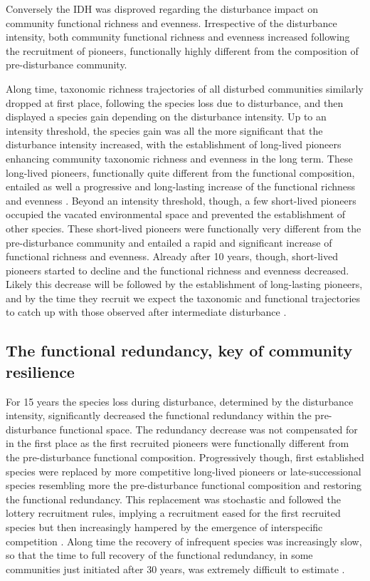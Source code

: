 \documentclass[fleqn,10pt]{ArtEcoFoG} %
\begin{document}
Conversely the IDH was disproved regarding the disturbance impact on
community functional richness and evenness. Irrespective of the
disturbance intensity, both community functional richness and evenness
increased following the recruitment of pioneers, functionally highly
different from the composition of pre-disturbance community.

Along time, taxonomic richness trajectories of all disturbed communities
similarly dropped at first place, following the species loss due to
disturbance, and then displayed a species gain depending on the
disturbance intensity. Up to an intensity threshold, the species gain
was all the more significant that the disturbance intensity increased,
with the establishment of long-lived pioneers enhancing community
taxonomic richness and evenness in the long term. These long-lived
pioneers, functionally quite different from the functional composition,
entailed as well a progressive and long-lasting increase of the
functional richness and evenness \citep{Denslow1980, Molino2001}. Beyond
an intensity threshold, though, a few short-lived pioneers occupied the
vacated environmental space and prevented the establishment of other
species. These short-lived pioneers were functionally very different
from the pre-disturbance community and entailed a rapid and significant
increase of functional richness and evenness. Already after 10 years,
though, short-lived pioneers started to decline and the functional
richness and evenness decreased. Likely this decrease will be followed
by the establishment of long-lasting pioneers, and by the time they
recruit we expect the taxonomic and functional trajectories to catch up
with those observed after intermediate disturbance \citep{Walker2009}.

\subsection{The functional redundancy, key of community
resilience}\label{the-functional-redundancy-key-of-community-resilience}

For 15 years the species loss during disturbance, determined by the
disturbance intensity, significantly decreased the functional redundancy
within the pre-disturbance functional space. The redundancy decrease was
not compensated for in the first place as the first recruited pioneers
were functionally different from the pre-disturbance functional
composition. Progressively though, first established species were
replaced by more competitive long-lived pioneers or late-successional
species resembling more the pre-disturbance functional composition and
restoring the functional redundancy. This replacement was stochastic and
followed the lottery recruitment rules, implying a recruitment eased for
the first recruited species but then increasingly hampered by the
emergence of interspecific competition \citep{Busing2002}. Along time
the recovery of infrequent species was increasingly slow, so that the
time to full recovery of the functional redundancy, in some communities
just initiated after 30 years, was extremely difficult to estimate
\citep{Elmqvist2003, Diaz2005}.
\end{document}
